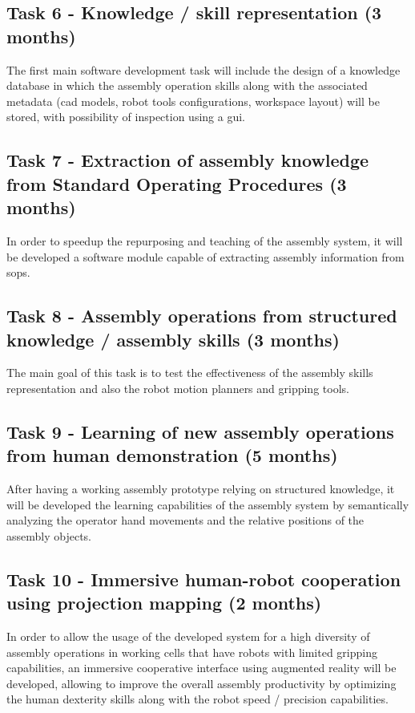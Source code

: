 \subsection{Task 6 - Knowledge / skill representation (3 months)}

The first main software development task will include the design of a knowledge database in which the assembly operation skills along with the associated metadata (\gls{cad} models, robot tools configurations, workspace layout) will be stored, with possibility of inspection using a \gls{gui}.


\subsection{Task 7 - Extraction of assembly knowledge from Standard Operating Procedures (3 months)}

In order to speedup the repurposing and teaching of the assembly system, it will be developed a software module capable of extracting assembly information from \glspl{sop}.


\subsection{Task 8 - Assembly operations from structured knowledge / assembly skills (3 months)}

The main goal of this task is to test the effectiveness of the assembly skills representation and also the robot motion planners and gripping tools.


\subsection{Task 9 - Learning of new assembly operations from human demonstration (5 months)}

After having a working assembly prototype relying on structured knowledge, it will be developed the learning capabilities of the assembly system by semantically analyzing the operator hand movements and the relative positions of the assembly objects.


\subsection{Task 10 - Immersive human-robot cooperation using projection mapping (2 months)}

In order to allow the usage of the developed system for a high diversity of assembly operations in working cells that have robots with limited gripping capabilities, an immersive cooperative interface using augmented reality will be developed, allowing to improve the overall assembly productivity by optimizing the human dexterity skills along with the robot speed / precision capabilities.


